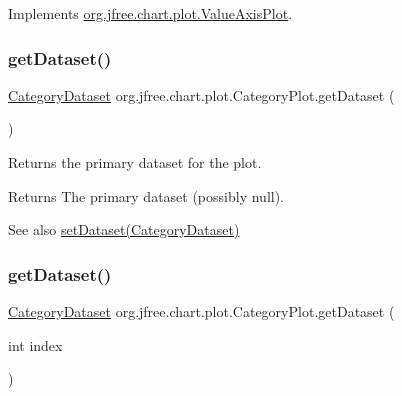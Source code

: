 Implements \mbox{\hyperlink{interfaceorg_1_1jfree_1_1chart_1_1plot_1_1_value_axis_plot_a54815b2f078c11b2618804fe3e7e5353}{org.\+jfree.\+chart.\+plot.\+Value\+Axis\+Plot}}.

\mbox{\label{classorg_1_1jfree_1_1chart_1_1plot_1_1_category_plot_aef991a0f3a5792964fc797125f53601d}} 
\subsubsection{\texorpdfstring{get\+Dataset()}{getDataset()}\hspace{0.1cm}{\footnotesize\ttfamily [1/2]}}
{\footnotesize\ttfamily \mbox{\hyperlink{interfaceorg_1_1jfree_1_1data_1_1category_1_1_category_dataset}{Category\+Dataset}} org.\+jfree.\+chart.\+plot.\+Category\+Plot.\+get\+Dataset (\begin{DoxyParamCaption}{ }\end{DoxyParamCaption})}

Returns the primary dataset for the plot.

\begin{DoxyReturn}{Returns}
The primary dataset (possibly {\ttfamily null}).
\end{DoxyReturn}
\begin{DoxySeeAlso}{See also}
\mbox{\hyperlink{classorg_1_1jfree_1_1chart_1_1plot_1_1_category_plot_af0a9e40a0ddee18dc429c2e8b1199b53}{set\+Dataset(\+Category\+Dataset)}} 
\end{DoxySeeAlso}
\mbox{\label{classorg_1_1jfree_1_1chart_1_1plot_1_1_category_plot_a2171d553581f0e3bcf252bad4464cb96}} 
\subsubsection{\texorpdfstring{get\+Dataset()}{getDataset()}\hspace{0.1cm}{\footnotesize\ttfamily [2/2]}}
{\footnotesize\ttfamily \mbox{\hyperlink{interfaceorg_1_1jfree_1_1data_1_1category_1_1_category_dataset}{Category\+Dataset}} org.\+jfree.\+chart.\+plot.\+Category\+Plot.\+get\+Dataset (\begin{DoxyParamCaption}\item[{int}]{index }\end{DoxyParamCaption})}

